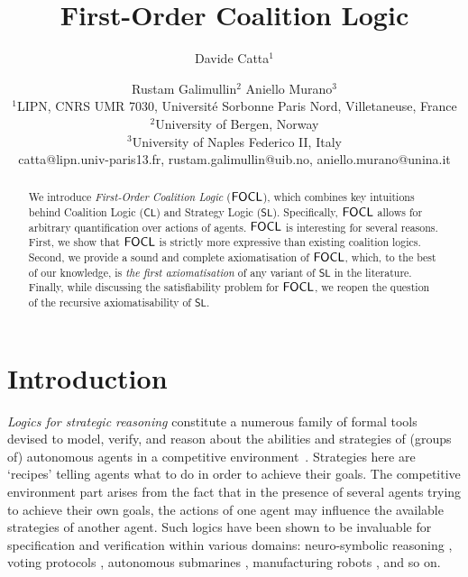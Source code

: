 \documentclass{article}
\title{First-Order Coalition Logic%
}
\author{
Davide Catta$^1$
\and
Rustam Galimullin$^2$\And
Aniello Murano$^{3}$\\
\affiliations
$^1$LIPN, CNRS UMR 7030, Université Sorbonne Paris Nord,
  Villetaneuse, France\\
$^2$University of Bergen, Norway\\
$^3$University of Naples Federico II, Italy\\
\emails
catta@lipn.univ-paris13.fr, rustam.galimullin@uib.no, 
aniello.murano@unina.it 
}
\begin{document}
\maketitle

\begin{abstract}
We introduce \textit{First-Order Coalition Logic} ($\mathsf{FOCL}$), which combines key intuitions behind Coalition Logic ($\mathsf{CL}$) and Strategy Logic ($\mathsf{SL}$). Specifically, $\mathsf{FOCL}$ allows for arbitrary quantification over actions of 
agents.  %
$\mathsf{FOCL}$ is interesting for several reasons. First, we show that $\mathsf{FOCL}$ is strictly more expressive than existing coalition logics. %
Second, we provide a sound and complete axiomatisation of $\mathsf{FOCL}$, which, to the best of our knowledge, is %
\textit{the first axiomatisation} of any variant of $\mathsf{SL}$ in the literature. %
Finally, while discussing the satisfiability problem for $\mathsf{FOCL}$, we reopen the question of the recursive axiomatisability of $\mathsf{SL}$.
\end{abstract}

\section{Introduction}
\textit{Logics for strategic reasoning} constitute a numerous family of formal tools devised to model, verify, and reason about the abilities and strategies of (groups of) autonomous agents in a competitive environment~\cite{pauly02,alur02,van2005logic,mogavero14,chatterjee2010strategy}. Strategies here are ‘recipes’ telling agents what to do in order to achieve their goals. The competitive environment part arises from the fact that in the presence of several agents trying to achieve their own goals, the actions of one agent may influence the available strategies of another agent. Such logics have been shown to be invaluable for specification and verification within various domains: neuro-symbolic reasoning \cite{akintunde20}, voting protocols \cite{jamroga18}, autonomous submarines \cite{ezekiel11}, manufacturing robots \cite{desilva17}, and so on. 
\end{document}
